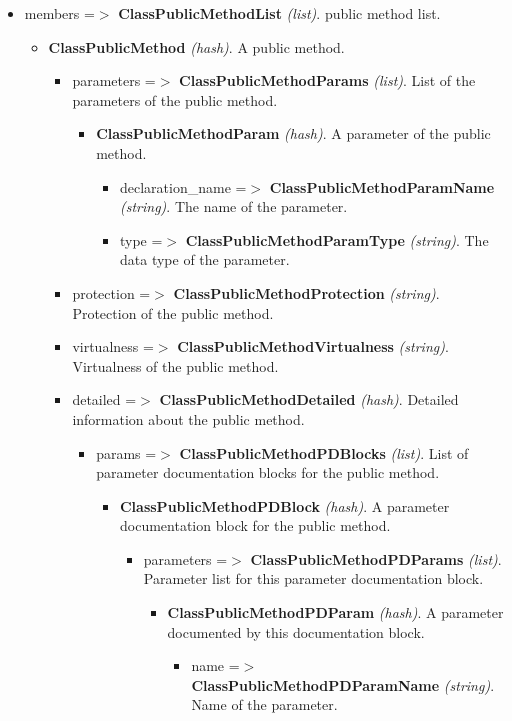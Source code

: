 \begin{itemize}
\begin{itemize}
\begin{itemize}
\begin{itemize}
\begin{itemize}
\item members =$>$ {\bf ClassPublicMethodList} {\em (list)\/}. public method list. \begin{itemize}
\item {\bf ClassPublicMethod} {\em (hash)\/}. A public method. \begin{itemize}
\item parameters =$>$ {\bf ClassPublicMethodParams} {\em (list)\/}. List of the parameters of the public method. \begin{itemize}
\item {\bf ClassPublicMethodParam} {\em (hash)\/}. A parameter of the public method. \begin{itemize}
\item declaration\_\-name =$>$ {\bf ClassPublicMethodParamName} {\em (string)\/}. The name of the parameter. \item type =$>$ {\bf ClassPublicMethodParamType} {\em (string)\/}. The data type of the parameter. \end{itemize}
\end{itemize}
\item protection =$>$ {\bf ClassPublicMethodProtection} {\em (string)\/}. Protection of the public method. \item virtualness =$>$ {\bf ClassPublicMethodVirtualness} {\em (string)\/}. Virtualness of the public method. \item detailed =$>$ {\bf ClassPublicMethodDetailed} {\em (hash)\/}. Detailed information about the public method. \begin{itemize}
\item params =$>$ {\bf ClassPublicMethodPDBlocks} {\em (list)\/}. List of parameter documentation blocks for the public method. \begin{itemize}
\item {\bf ClassPublicMethodPDBlock} {\em (hash)\/}. A parameter documentation block for the public method. \begin{itemize}
\item parameters =$>$ {\bf ClassPublicMethodPDParams} {\em (list)\/}. Parameter list for this parameter documentation block. \begin{itemize}
\item {\bf ClassPublicMethodPDParam} {\em (hash)\/}. A parameter documented by this documentation block. \begin{itemize}
\item name =$>$ {\bf ClassPublicMethodPDParamName} {\em (string)\/}. Name of the parameter. \end{itemize}

\end{itemize}
\end{itemize}
\end{itemize}
\end{itemize}
\end{itemize}
\end{itemize}
\end{itemize}
\end{itemize}
\end{itemize}
\end{itemize}
\end{itemize}
